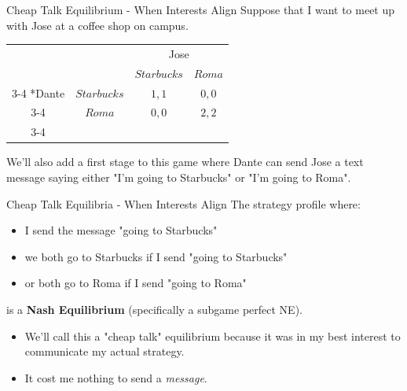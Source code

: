 

\begin{frame}{Cheap Talk Equilibrium - When Interests Align}
  Suppose that I want to meet up with Jose at a coffee shop on campus.
  \begin{table}[!h]
    \centering
    \begin{tabular}{cc|c|c|}
    & \multicolumn{1}{c}{} & \multicolumn{2}{c}{Jose}\\
    & \multicolumn{1}{c}{} & \multicolumn{1}{c}{$Starbucks$}  & \multicolumn{1}{c}{$Roma$} \\\cline{3-4}
    \multirow{2}*{Dante}  & $Starbucks$ & $1, 1$ & $0,0$ \\\cline{3-4}
                          & $Roma$       & $0, 0$ & $2,2$ \\\cline{3-4}
  \end{tabular}
  \end{table}

  We'll also add a first stage to this game 
  where Dante can send Jose a text message saying either 
  "I'm going to Starbucks" or "I'm going to Roma".
\end{frame}


\begin{frame}{Cheap Talk Equilibria - When Interests Align}
  The strategy profile where:
  \begin{itemize}
    \item  
    I send the message "going to Starbucks"
    \item
    we both go to Starbucks if I send "going to Starbucks"
    \item 
    or both go to Roma if I send "going to Roma"
  \end{itemize}
  is a \textbf{Nash Equilibrium} (specifically a subgame perfect NE).
  \begin{itemize}
    \item We'll call this a \alert{"cheap talk"} equilibrium 
    because it was in my best interest to communicate my actual strategy.
    \item It cost me nothing to send a \textit{message}.
  \end{itemize}
\end{frame}



